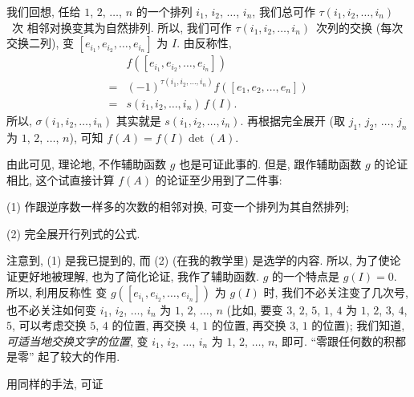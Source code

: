 我们回想,
任给 \(1\), \(2\), \(\dots\), \(n\)
的一个排列 \(i_1\), \(i_2\), \(\dots\), \(i_n\),
我们总可作 \(\tau (i_1, i_2, \dots, i_n)\)~次%
相邻对换变其为自然排列.
所以, 我们可作
\(\tau (i_1, i_2, \dots, i_n)\)~次列的交换
(每次交换二列),
变 \([e_{i_1}, e_{i_2}, \dots, e_{i_n}]\) 为 \(I\).
由反称性,
\begin{align*}
         & f([e_{i_1}, e_{i_2}, \dots, e_{i_n}])
    \\
    = {} & (-1)^{\tau (i_1, i_2, \dots, i_n)}
    f([e_1, e_2, \dots, e_n])                    \\
    = {} & s(i_1, i_2, \dots, i_n)\, f(I).
\end{align*}
所以,
\(\sigma (i_1, i_2, \dots, i_n)\)
其实就是
\(s(i_1, i_2, \dots, i_n)\).
再根据完全展开
(取 \(j_1\), \(j_2\), \(\dots\), \(j_n\)
为 \(1\), \(2\), \(\dots\), \(n\)),
可知 \(f(A) = f(I) \det {(A)}\).

由此可见, 理论地, 不作辅助函数 \(g\) 也是可证此事的.
但是, 跟作辅助函数 \(g\) 的论证相比,
这个试直接计算 \(f(A)\) 的论证至少用到了二件事:

(1)
作跟逆序数一样多的次数的相邻对换,
可变一个排列为其自然排列;

(2)
完全展开行列式的公式.

注意到, (1) 是我已提到的, 而 (2)
(在我的教学里) 是选学的内容.
所以, 为了使论证更好地被理解,
也为了简化论证,
我作了辅助函数.
\(g\) 的一个特点是 \(g(I) = 0\).
所以, 利用反称性%
变 \(g([e_{i_1}, e_{i_2}, \dots, e_{i_n}])\)
为 \(g(I)\) 时,
我们不必关注变了几次号,
也不必关注如何变
\(i_1\), \(i_2\), \(\dots\), \(i_n\)
为 \(1\), \(2\), \(\dots\), \(n\)
(比如, 要变 \(3\), \(2\), \(5\), \(1\), \(4\)
为 \(1\), \(2\), \(3\), \(4\), \(5\),
可以考虑交换 \(5\), \(4\) 的位置,
再交换 \(4\), \(1\) 的位置,
再交换 \(3\), \(1\) 的位置);
我们知道, \emph{可适当地交换文字的位置},
变 \(i_1\), \(i_2\), \(\dots\), \(i_n\)
为 \(1\), \(2\), \(\dots\), \(n\),
即可.
``零跟任何数的积都是零''
起了较大的作用.

用同样的手法, 可证

